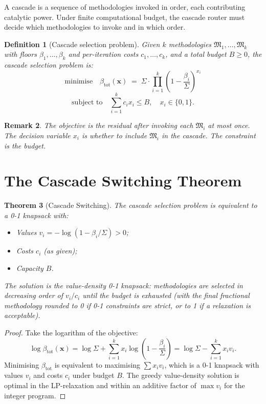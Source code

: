 \documentclass[twocolumn,11pt,a4paper]{article}
\newtheorem{theorem}{Theorem}[section]
\newtheorem{definition}[theorem]{Definition}
\newtheorem{remark}[theorem]{Remark}
\newcommand{\Method}{\mathfrak{M}}
\newcommand{\Sigmax}{\Sigma}
\begin{document}
A cascade is a sequence of methodologies invoked in order, each contributing catalytic power. Under finite computational budget, the cascade router must decide which methodologies to invoke and in which order.

\begin{definition}[Cascade selection problem]
\label{def:cascade-selection}
Given $k$ methodologies $\Method_1, \ldots, \Method_k$ with floors $\beta_1, \ldots, \beta_k$ and per-iteration costs $c_1, \ldots, c_k$, and a total budget $B \geq 0$, the \emph{cascade selection problem} is:
\[
\text{minimise} \quad \beta_{\text{tot}}(\mathbf{x}) \;=\; \Sigmax \cdot \prod_{i=1}^{k} \left(1 - \frac{\beta_i}{\Sigmax}\right)^{x_i}
\]
\[
\text{subject to} \quad \sum_{i=1}^{k} c_i x_i \leq B, \quad x_i \in \{0, 1\}.
\]
\end{definition}

\begin{remark}
The objective is the residual after invoking each $\Method_i$ at most once. The decision variable $x_i$ is whether to include $\Method_i$ in the cascade. The constraint is the budget.
\end{remark}

\section{The Cascade Switching Theorem}
\label{sec:cascade-switching}

\begin{theorem}[Cascade Switching]
\label{thm:cascade-switching}
The cascade selection problem is equivalent to a 0-1 knapsack with:
\begin{itemize}[nosep, leftmargin=*]
\item \emph{Values} $v_i = -\log(1 - \beta_i/\Sigmax) > 0$;
\item \emph{Costs} $c_i$ (as given);
\item \emph{Capacity} $B$.
\end{itemize}
The solution is the value-density 0-1 knapsack: methodologies are selected in decreasing order of $v_i / c_i$ until the budget is exhausted (with the final fractional methodology rounded to 0 if 0-1 constraints are strict, or to 1 if a relaxation is acceptable).
\end{theorem}

\begin{proof}
Take the logarithm of the objective:
\[
\log \beta_{\text{tot}}(\mathbf{x}) = \log \Sigmax + \sum_{i=1}^{k} x_i \log\left(1 - \frac{\beta_i}{\Sigmax}\right) = \log \Sigmax - \sum_{i=1}^{k} x_i v_i.
\]
Minimising $\beta_{\text{tot}}$ is equivalent to maximising $\sum x_i v_i$, which is a 0-1 knapsack with values $v_i$ and costs $c_i$ under budget $B$. The greedy value-density solution is optimal in the LP-relaxation \citep{cormen2009introduction} and within an additive factor of $\max v_i$ for the integer program.
\end{proof}
\end{document}
